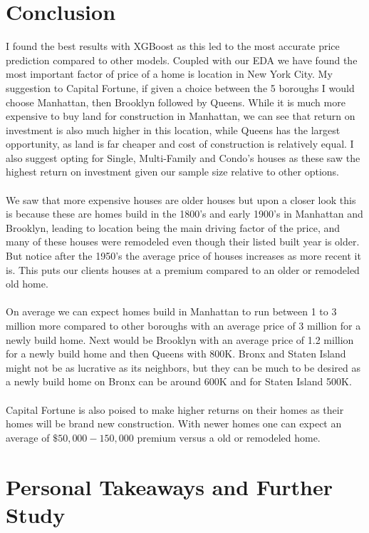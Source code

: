 \documentclass{article}
\begin{document}
\begin{titlepage}
\section{Conclusion}
I found the best results with XGBoost as this led to the most accurate price prediction compared to other models. Coupled with our EDA we have found the most important factor of price of a home is location in New York City. My suggestion to Capital Fortune, if given a choice between the 5 boroughs I would choose Manhattan, then Brooklyn followed by Queens. While it is much more expensive to buy land for construction in Manhattan, we can see that return on investment is also much higher in this location, while Queens has the largest opportunity, as land is far cheaper and cost of construction is relatively equal. I also suggest opting for Single, Multi-Family and Condo's houses as these saw the highest return on investment given our sample size relative to other options.\\
\\
We saw that more expensive houses are older houses but upon a closer look this is because these are homes build in the 1800's and early 1900's in Manhattan and Brooklyn, leading to location being the main driving factor of the price, and many of these houses were remodeled even though their listed built year is older. But notice after the 1950's the average price of houses increases as more recent it is. This puts our clients houses at a premium compared to an older or remodeled old home.\\
\\
On average we can expect homes build in Manhattan to run between 1 to 3 million more compared to other boroughs with an average price of 3 million for a newly build home. Next would be Brooklyn with an average price of 1.2 million for a newly build home and then Queens with 800K. Bronx and Staten Island might not be as lucrative as its neighbors, but they can be much to be desired as a newly build home on Bronx can be around 600K and for Staten Island 500K. \\
\\
Capital Fortune is also poised to make higher returns on their homes as their homes will be brand new construction. With newer homes one can expect an average of $\$50,000-150,000$ premium versus a old or remodeled home. 

\section{Personal Takeaways and Further Study}


\end{titlepage}
\end{document}
